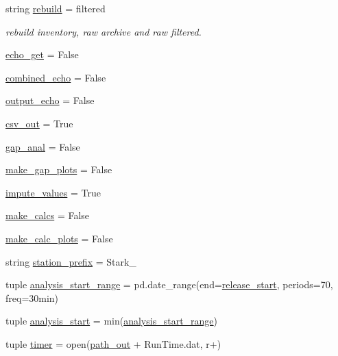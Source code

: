 \begin{DoxyCompactItemize}
\item 
string \hyperlink{namespace_preprocess_01_e_t_ab01d8bd9afb01694d081decb02687fc9}{rebuild} = \textquotesingle{}filtered\textquotesingle{}
\begin{DoxyCompactList}\small\item\em rebuild inventory, raw archive and raw filtered. \end{DoxyCompactList}\item 
\hyperlink{namespace_preprocess_01_e_t_adfbac2f19a9ab903cc0b66cc8fa19895}{echo\+\_\+get} = False
\item 
\hyperlink{namespace_preprocess_01_e_t_aac725ccf80572247e41121e75a0c34a6}{combined\+\_\+echo} = False
\item 
\hyperlink{namespace_preprocess_01_e_t_a9a973ca22b7e32bb98c499b9d703589c}{output\+\_\+echo} = False
\item 
\hyperlink{namespace_preprocess_01_e_t_a13722152c5bbb268e7c8974b9617c267}{csv\+\_\+out} = True
\item 
\hyperlink{namespace_preprocess_01_e_t_aede28f77ad85357828b0b3698edc08d9}{gap\+\_\+anal} = False
\item 
\hyperlink{namespace_preprocess_01_e_t_ae27e269ff9fd7f96b7639c7417e34ab0}{make\+\_\+gap\+\_\+plots} = False
\item 
\hyperlink{namespace_preprocess_01_e_t_ab1c6d2c68092605d890b308dd6ae63cf}{impute\+\_\+values} = True
\item 
\hyperlink{namespace_preprocess_01_e_t_a9232b305c8f0040028a54ba9cbaadf09}{make\+\_\+calcs} = False
\item 
\hyperlink{namespace_preprocess_01_e_t_a56359fcc3c93b1624e18648ebd54b0ac}{make\+\_\+calc\+\_\+plots} = False
\item 
string \hyperlink{namespace_preprocess_01_e_t_aee0076efa8b1860288f3b74c5c621a04}{station\+\_\+prefix} = \textquotesingle{}Stark\+\_\+\textquotesingle{}
\item 
tuple \hyperlink{namespace_preprocess_01_e_t_a7cd48cca4b37e2ed1fd0402b315c2d39}{analysis\+\_\+start\+\_\+range} = pd.\+date\+\_\+range(end=\hyperlink{namespace_preprocess_01_e_t_ab39b88edc6dd3541bec4573f18c49552}{release\+\_\+start}, periods=70, freq=\textquotesingle{}30min\textquotesingle{})
\item 
tuple \hyperlink{namespace_preprocess_01_e_t_adb1bbba4e6366ba6edb532e941cc5b89}{analysis\+\_\+start} = min(\hyperlink{namespace_preprocess_01_e_t_a7cd48cca4b37e2ed1fd0402b315c2d39}{analysis\+\_\+start\+\_\+range})
\item 
tuple \hyperlink{namespace_preprocess_01_e_t_ad5970f6891d846d79808f7d02dbc9f0e}{timer} = open(\hyperlink{namespace_preprocess_01_e_t_aa8c626406a6808516d849d8b130cd865}{path\+\_\+out} + \textquotesingle{}Run\+Time.\+dat\textquotesingle{}, \textquotesingle{}r+\textquotesingle{})

\end{DoxyCompactItemize}
